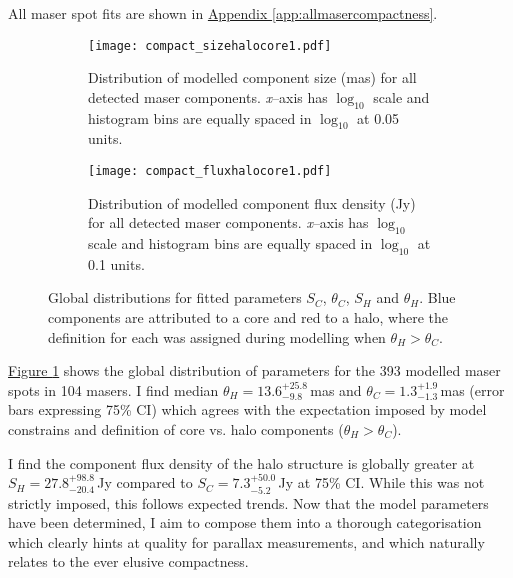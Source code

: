         All maser spot fits are shown in \hyperref[app:allmasercompactness]{Appendix \ref*{app:allmasercompactness}}.
        
        \begin{figure}[H]
            \begin{subfigure}[t]{0.48\linewidth}
                \texttt{[image: compact\_sizehalocore1.pdf]}
                \caption{\footnotesize Distribution of modelled component size (mas) for all detected maser components. {\it x}--axis has $\log_{10}$ scale and histogram bins are equally spaced in $\log_{10}$ at 0.05 units.}
            \end{subfigure}
            \hfill
            \begin{subfigure}[t]{0.48\linewidth}
                \texttt{[image: compact\_fluxhalocore1.pdf]}
                \caption{\footnotesize Distribution of modelled component flux density (Jy) for all detected maser components. {\it x}--axis has $\log_{10}$ scale and histogram bins are equally spaced in $\log_{10}$ at 0.1 units.}
            \end{subfigure}   
            \caption[Global distributions of $S_C$, $\theta_C$, $S_H$ and $\theta_H$]{Global distributions for fitted parameters $S_C$, $\theta_C$, $S_H$ and $\theta_H$. Blue components are attributed to a core and red to a halo, where the definition for each was assigned during modelling when $\theta_H>\theta_C$.}
            \label{fig:model_parameters}                                   
        \end{figure}
        
        \hyperref[fig:model_parameters]{Figure \ref*{fig:model_parameters}} shows the global distribution of parameters for the 393 modelled maser spots in 104 masers. I find median $\theta_H=13.6^{+25.8}_{-9.8}$\,mas and $\theta_C=1.3^{+1.9}_{-1.3}$\,mas (error bars expressing 75\% CI) which agrees with the expectation imposed by model constrains and definition of core vs. halo components (${\theta_H}>{\theta_C}$).
        
        I find the component flux density of the halo structure is globally greater at $S_H =27.8^{+98.8}_{-20.4}$\,Jy compared to $S_C=7.3^{+50.0}_{-5.2}$\,Jy at 75\% CI. While this was not strictly imposed, this follows expected trends. Now that the model parameters have been determined, I aim to compose them into a thorough categorisation which clearly hints at quality for parallax measurements, and which naturally relates to the ever elusive compactness.

